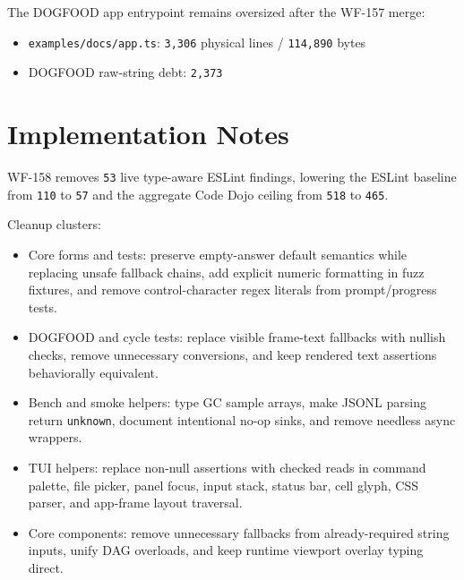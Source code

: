 The DOGFOOD app entrypoint remains oversized after the WF-157 merge:

\begin{itemize}
\tightlist
\item
  \texttt{e\allowbreak{}x\allowbreak{}a\allowbreak{}m\allowbreak{}p\allowbreak{}l\allowbreak{}e\allowbreak{}s\allowbreak{}/\allowbreak{}d\allowbreak{}o\allowbreak{}c\allowbreak{}s\allowbreak{}/\allowbreak{}a\allowbreak{}p\allowbreak{}p\allowbreak{}.\allowbreak{}t\allowbreak{}s}: \texttt{3\allowbreak{},\allowbreak{}3\allowbreak{}0\allowbreak{}6} physical lines / \texttt{1\allowbreak{}1\allowbreak{}4\allowbreak{},\allowbreak{}8\allowbreak{}9\allowbreak{}0} bytes
\item
  DOGFOOD raw-string debt: \texttt{2\allowbreak{},\allowbreak{}3\allowbreak{}7\allowbreak{}3}
\end{itemize}

\section{Implementation Notes}\label{record-240-implementation-notes}

WF-158 removes \texttt{5\allowbreak{}3} live type-aware ESLint findings, lowering the ESLint baseline from \texttt{1\allowbreak{}1\allowbreak{}0} to \texttt{5\allowbreak{}7} and the aggregate Code Dojo ceiling from \texttt{5\allowbreak{}1\allowbreak{}8} to \texttt{4\allowbreak{}6\allowbreak{}5}.

Cleanup clusters:

\begin{itemize}
\tightlist
\item
  Core forms and tests: preserve empty-answer default semantics while replacing unsafe fallback chains, add explicit numeric formatting in fuzz fixtures, and remove control-character regex literals from prompt/progress tests.
\item
  DOGFOOD and cycle tests: replace visible frame-text fallbacks with nullish checks, remove unnecessary conversions, and keep rendered text assertions behaviorally equivalent.
\item
  Bench and smoke helpers: type GC sample arrays, make JSONL parsing return \texttt{u\allowbreak{}n\allowbreak{}k\allowbreak{}n\allowbreak{}o\allowbreak{}w\allowbreak{}n}, document intentional no-op sinks, and remove needless async wrappers.
\item
  TUI helpers: replace non-null assertions with checked reads in command palette, file picker, panel focus, input stack, status bar, cell glyph, CSS parser, and app-frame layout traversal.
\item
  Core components: remove unnecessary fallbacks from already-required string inputs, unify DAG overloads, and keep runtime viewport overlay typing direct.
\end{itemize}

